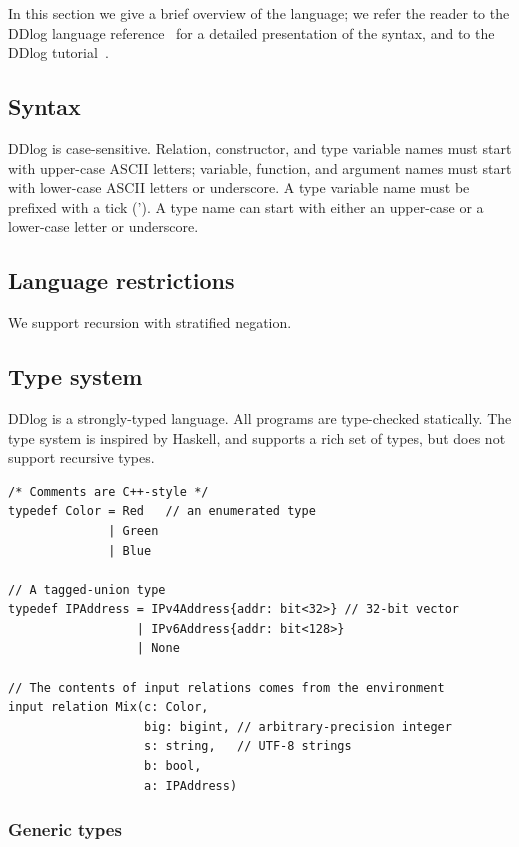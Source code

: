 In this section we give a brief overview of the language; we refer the
reader to the DDlog language reference~\cite{ddlog-manual} for a
detailed presentation of the syntax, and to the DDlog
tutorial~\cite{ddlog-tutorial}.

\subsection{Syntax}

DDlog is case-sensitive.  Relation, constructor, and type variable
names must start with upper-case ASCII letters; variable, function,
and argument names must start with lower-case ASCII letters or
underscore.  A type variable name must be prefixed with a tick ('). A
type name can start with either an upper-case or a lower-case letter
or underscore.

\subsection{Language restrictions}

We support recursion with stratified negation.

\subsection{Type system}

DDlog is a strongly-typed language.  All programs are type-checked
statically.  The type system is inspired by Haskell, and supports a
rich set of types, but does not support recursive types.

\begin{lstlisting}[language=ddlog]
/* Comments are C++-style */
typedef Color = Red   // an enumerated type
              | Green
              | Blue

// A tagged-union type
typedef IPAddress = IPv4Address{addr: bit<32>} // 32-bit vector
                  | IPv6Address{addr: bit<128>}
                  | None

// The contents of input relations comes from the environment
input relation Mix(c: Color,
                   big: bigint, // arbitrary-precision integer
                   s: string,   // UTF-8 strings
                   b: bool,
                   a: IPAddress)
\end{lstlisting}

\subsubsection{Generic types}

